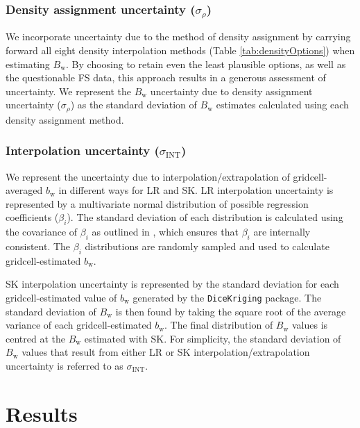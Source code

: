 \documentclass[twocolumn, letterpaper]{igs}
\begin{document}
	\subsubsection{Density assignment uncertainty ($\sigma_{\rho}$)}
We incorporate uncertainty due to the method of density assignment by carrying forward all eight density interpolation methods (Table \ref{tab:densityOptions}) when estimating $B_\mathrm{w}$. By choosing to retain even the least plausible options, as well as the questionable FS data, this approach results in a generous assessment of uncertainty. We represent the $B_\mathrm{w}$ uncertainty due to density assignment uncertainty ($\sigma_{\rho}$) as the standard deviation of $B_\mathrm{w}$ estimates calculated using each density assignment method.

	\subsubsection{Interpolation uncertainty ($\sigma_{\mathrm{INT}}$)}
We represent the uncertainty due to interpolation/extrapolation of gridcell-averaged $b_\mathrm{w}$ in different ways for LR and SK. LR interpolation uncertainty is represented by a multivariate normal distribution of possible regression coefficients ($\beta_i$). The standard deviation of each distribution is calculated using the covariance of $\beta_i$ as outlined in \cite{Bagos2015}, which ensures that $\beta_i$ are internally consistent. The $\beta_i$ distributions are randomly sampled and used to calculate gridcell-estimated $b_\mathrm{w}$.

SK interpolation uncertainty is represented by the standard deviation for each gridcell-estimated value of $b_\mathrm{w}$ generated by the \texttt{DiceKriging} package. The standard deviation of $B_\mathrm{w}$ is then found by taking the square root of the average variance of each gridcell-estimated $b_\mathrm{w}$. The final distribution of $B_\mathrm{w}$ values is centred at the $B_\mathrm{w}$ estimated with SK. For simplicity, the standard deviation of $B_\mathrm{w}$ values that result from either LR or SK interpolation/extrapolation uncertainty is referred to as $\sigma_{\mathrm{INT}}$.



\section{Results}
\end{document}

